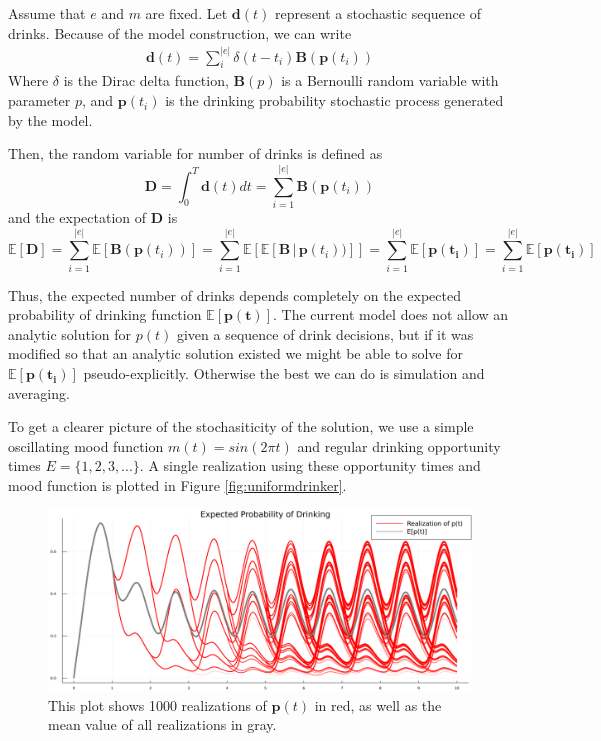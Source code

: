 \documentclass{journal}
\theoremstyle{definition}
\begin{document}
Assume that $e$ and $m$ are fixed. Let $\mathbf{d}(t)$ represent a stochastic sequence of drinks. Because of the model construction, we can write 
\begin{align*}
\mathbf{d}(t) = \sum_i^{|e|} \delta (t - t_i)\mathbf{B}(\mathbf{p}(t_i))
\end{align*}
Where $\delta$ is the Dirac delta function, $\mathbf{B}(p)$ is a Bernoulli random variable with parameter $p$, and $\mathbf{p}(t_i)$ is the drinking probability stochastic process generated by the model.

Then, the random variable for number of drinks is defined as 
\[
\mathbf{D} = \int_0^T \mathbf{d}(t)dt = \sum_{i=1}^{|e|} \mathbf{B}(\mathbf{p}(t_i))
\]
and the expectation of $\mathbf{D}$ is
\begin{equation} \label{equ:expectdrink}
\mathbb{E}[\mathbf{D}] = \sum_{i=1}^{|e|}\mathbb{E}[\mathbf{B}(\mathbf{p}(t_i))] = \sum_{i=1}^{|e|} \mathbb{E}[\mathbb{E}[\mathbf{B} \, | \, \mathbf{p}(t_i))]] = \sum_{i=1}^{|e|} \mathbb{E}[\mathbf{p(t_i)}] = \sum_{i=1}^{|e|} \mathbb{E}[\mathbf{p(t_i)}]
\end{equation}

Thus, the expected number of drinks depends completely on the expected probability of drinking function $\mathbb{E}[\mathbf{p(t)}]$. The current model does not allow an analytic solution for $p(t)$ given a sequence of drink decisions, but if it was modified so that an analytic solution existed we might be able to solve for $\mathbb{E}[\mathbf{p(t_i)}]$ pseudo-explicitly. Otherwise the best we can do is simulation and averaging.

To get a clearer picture of the stochasiticity of the solution, we use a simple oscillating mood function $m(t) = sin(2\pi t)$ and regular drinking opportunity times $E = \{1, 2, 3, ...\}$. A single realization using these opportunity times and mood function is plotted in Figure \ref{fig:uniformdrinker}.

\begin{figure}[h] \label{fig:expectedp}
	\includegraphics[width=\textwidth]{expected_p.png}
	\caption{This plot shows 1000 realizations of $\mathbf{p}(t)$ in red, as well as the mean value of all realizations in gray. }
\end{figure}
\end{document}
